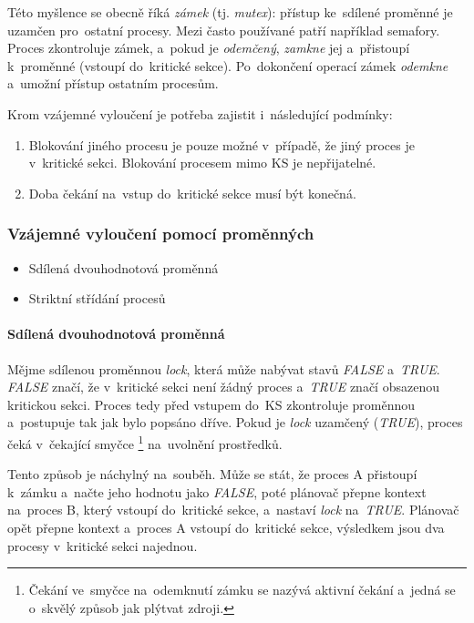Této myšlence se obecně říká \emph{zámek} (tj. \emph{mutex}): přístup ke~sdílené proměnné je uzamčen pro~ostatní procesy. Mezi často používané patří například semafory. Proces zkontroluje zámek, a~pokud je \emph{odemčený}, \emph{zamkne} jej a~přistoupí k~proměnné (vstoupí do~kritické sekce). Po~dokončení operací zámek \emph{odemkne} a~umožní přístup ostatním procesům.

Krom vzájemné vyloučení je potřeba zajistit i~následující podmínky:

\begin{enumerate}
	\item Blokování jiného procesu je pouze možné v~případě, že jiný proces je v~kritické sekci. Blokování procesem mimo KS je nepřijatelné.
	\item Doba čekání na~vstup do~kritické sekce musí být konečná.
\end{enumerate}

\subsubsection{Vzájemné vyloučení pomocí proměnných}

\begin{itemize}
	\item Sdílená dvouhodnotová proměnná
	\item Striktní střídání procesů
\end{itemize}

\paragraph{Sdílená dvouhodnotová proměnná}

Mějme sdílenou proměnnou \emph{lock}, která může nabývat stavů \emph{FALSE} a~\emph{TRUE}. \emph{FALSE} značí, že v~kritické sekci není žádný proces a~\emph{TRUE} značí obsazenou kritickou sekci. Proces tedy před vstupem do~KS zkontroluje proměnnou a~postupuje tak jak bylo popsáno dříve. Pokud je \emph{lock} uzamčený (\emph{TRUE}), proces čeká v~čekající smyčce%
\footnote{Čekání ve~smyčce na~odemknutí zámku se nazývá aktivní čekání a~jedná se o~skvělý způsob jak plýtvat zdroji.}
na~uvolnění prostředků.

Tento způsob je náchylný na~souběh. Může se stát, že proces A přistoupí k~zámku a~načte jeho hodnotu jako \emph{FALSE}, poté plánovač přepne kontext na~proces B, který vstoupí do~kritické sekce, a~nastaví \emph{lock} na~\emph{TRUE}. Plánovač opět přepne kontext a~proces A vstoupí do~kritické sekce, výsledkem jsou dva procesy v~kritické sekci najednou.


